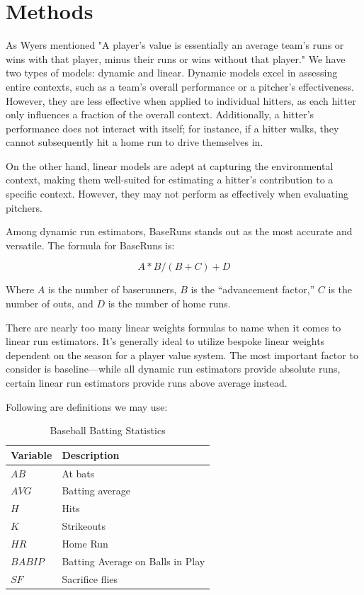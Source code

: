 \documentclass[12pt]{article}
\begin{document}
\section{Methods}
\label{sec:meth}

As Wyers mentioned  "A player's value is essentially an average team's 
runs or wins with that player, minus their runs or wins without that player." \citep*{web:Wyers:Part2} We have two 
types of models: dynamic and linear. Dynamic models excel in assessing entire contexts, such as a team's overall performance or 
a pitcher's effectiveness. However, they are less effective when applied to individual hitters, as each hitter 
only influences a fraction of the overall context. Additionally, a hitter's performance 
does not interact with itself; for instance, if a hitter walks, they cannot subsequently hit a home run to drive 
themselves in.

On the other hand, linear models are adept at capturing the environmental context, making them 
well-suited for estimating a hitter's contribution to a specific context. However, they may not perform as 
effectively when evaluating pitchers. 

Among dynamic run estimators, BaseRuns stands out as the most accurate and versatile. The formula for BaseRuns is:

\begin{equation}
  \label{eq:baseRuns}
A*B/(B + C) + D
\end{equation}

Where $A$ is the number of baserunners, $B$ is the “advancement factor,” $C$ is the number of outs, and $D$ is the 
number of home runs.

There are nearly too many linear weights formulas to name when it comes to linear run estimators. It's generally 
ideal to utilize bespoke linear weights dependent on the season for a player value system. The most important 
factor to consider is baseline—while all dynamic run estimators provide absolute runs, certain linear run estimators
provide runs above average instead. 

Following are definitions we may use:
\begin{table}[htbp]
  \caption{Baseball Batting Statistics}
  \label{tab:discription} 
  \centering
  \begin{tabular}{|l|l|}
     \hline
     \textbf{Variable} & \textbf{Description}\\
     \hline
     $AB$ & At bats\\
     $AVG$ & Batting average\\
     $H$ & Hits\\
     $K$ & Strikeouts\\
     $HR$ & Home Run\\
     $BABIP$ & Batting Average on Balls in Play\\
     $SF$ & Sacrifice flies\\
    \hline
  \end{tabular}
\end{table}
\end{document}
